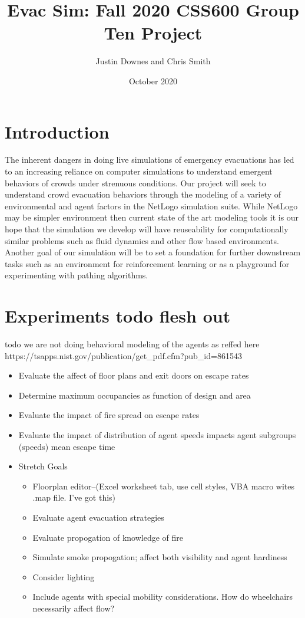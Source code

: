 \documentclass[12pt,letterpaper]{article}
\begin{document}
\title{\vspace{-3cm}Evac Sim: Fall 2020 CSS600 Group Ten Project}
\author{Justin Downes and Chris Smith}
\date{October 2020}
\maketitle

\section {Introduction}

The inherent dangers in doing live simulations of emergency evacuations has led to an increasing reliance on computer simulations to understand emergent behaviors of crowds under strenuous conditions\cite{almeidaCrowdSimulationModeling2013}.  Our project will seek to understand crowd evacuation behaviors through the modeling of a variety of environmental and agent factors in the NetLogo simulation suite. While NetLogo may be simpler environment then current state of the art modeling tools it is our hope that the simulation we develop will have reuseability for computationally similar problems such as fluid dynamics and other flow based environments. Another goal of our simulation will be to set a foundation for further downstream tasks such as an environment for reinforcement learning or as a playground for experimenting with pathing algorithms.

\section {Experiments todo flesh out}
todo we are not doing behavioral modeling of the agents as reffed here  https://tsapps.nist.gov/publication/get\_pdf.cfm?pub\_id=861543

\begin{itemize}
\item Evaluate the affect of floor plans and exit doors on escape rates
\item Determine maximum occupancies as function of design and area
\item Evaluate the impact of fire spread on escape rates
\item Evaluate the impact of distribution of agent speeds impacts agent subgroups (speeds) mean escape time
\item Stretch Goals
\begin{itemize}
\item Floorplan editor--(Excel worksheet tab, use cell styles, VBA macro wites .map file. I've got this)
\item Evaluate agent evacuation strategies
\item Evaluate propogation of knowledge of fire
\item Simulate smoke propogation; affect both visibility and agent hardiness
\item Consider lighting
\item Include agents with special mobility considerations. How do wheelchairs necessarily affect flow?
\end{itemize}
\end{itemize}
\end{document}
